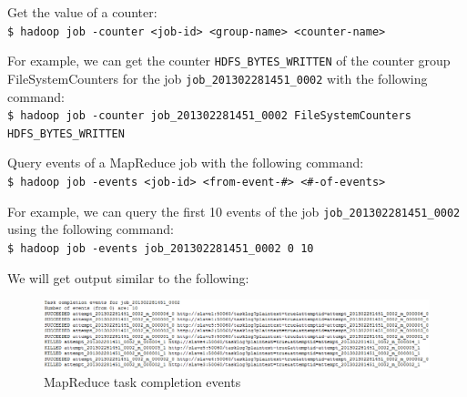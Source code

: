 Get the value of a counter: \\
\verb|$ hadoop job -counter <job-id> <group-name> <counter-name>|

For example, we can get the counter \verb|HDFS_BYTES_WRITTEN| of the counter group FileSystemCounters for the job \verb|job_201302281451_0002| with the following command: \\ 
\verb|$ hadoop job -counter job_201302281451_0002 FileSystemCounters HDFS_BYTES_WRITTEN| 

Query events of a MapReduce job with the following command: \\
\verb|$ hadoop job -events <job-id> <from-event-#> <#-of-events>|

For example, we can query the first 10 events of the job \verb|job_201302281451_0002| using the following command: \\
\verb|$ hadoop job -events job_201302281451_0002 0 10|

We will get output similar to the following:
\begin{figure}[h]
  \centering
  \includegraphics[width=\textwidth]{figs/5163OS_04_13.png}
  \caption{MapReduce task completion events}\label{fig:task.events}
\end{figure} 


